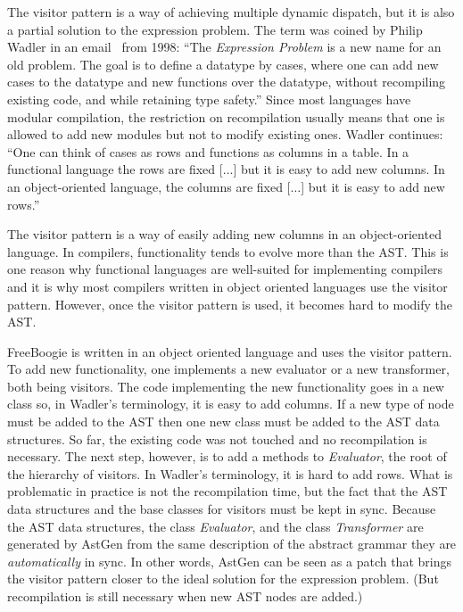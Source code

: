 \documentclass{llncs}
\begin{document}
The visitor pattern is a way of achieving multiple dynamic
dispatch, but it is also a partial solution to the
expression problem. The term was coined by Philip Wadler in an
email~\cite{wadler1998ep} from 1998: ``The \emph{Expression
Problem} is a new name for an old problem. The goal is to define
a datatype by cases, where one can add new cases to the datatype
and new functions over the datatype, without recompiling existing
code, and while retaining type safety.'' Since most languages
have modular compilation, the restriction on recompilation
usually means that one is allowed to add new modules but not to
modify existing ones. Wadler continues: ``One can think of cases
as rows and functions as columns in a table. In a functional
language the rows are fixed [$\ldots$] but it is easy to add new
columns. In an object-oriented language, the columns are fixed
[$\ldots$] but it is easy to add new rows.''

The visitor pattern is a way of easily adding new columns in
an object-oriented language. In compilers, functionality tends
to evolve more than the AST. This is one reason why functional
languages are well-suited for implementing compilers and it is
why most compilers written in object oriented languages use the
visitor pattern. However, once the visitor pattern is used, it
becomes hard to modify the AST.

FreeBoogie is written in an object oriented language and uses
the visitor pattern. To add new functionality, one implements a
new evaluator or a new transformer, both being visitors. The
code implementing the new functionality goes in a new class so,
in Wadler's terminology, it is easy to add columns. If a new
type of node must be added to the AST then one new class must
be added to the AST data structures. So far, the existing code
was not touched and no recompilation is necessary. The next
step, however, is to add a methods to \textit{Evaluator}, the
root of the hierarchy of visitors. In Wadler's terminology, it
is hard to add rows. What is problematic in practice is not the
recompilation time, but the fact that the AST data structures
and the base classes for visitors must be kept in sync. Because
the AST data structures, the class \textit{Evaluator}, and the
class \textit{Transformer} are generated by AstGen from the same
description of the abstract grammar they are \emph{automatically}
in sync. In other words, AstGen can be seen as a patch that
brings the visitor pattern closer to the ideal solution for the
expression problem. (But recompilation is still necessary when
new AST nodes are added.)
\end{document}
